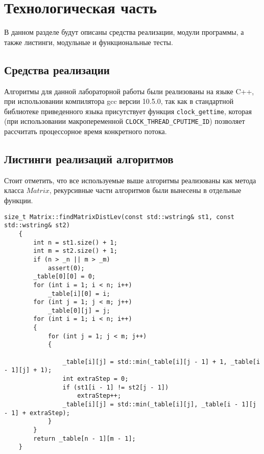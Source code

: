 \chapter{Технологическая часть}
В данном разделе будут описаны средства реализации, модули программы, а также листинги, модульные и функциональные тесты.

\section{Средства реализации}
Алгоритмы для данной лабораторной работы были реализованы на языке C++, при использовании компилятора gcc версии 10.5.0, так как в стандартной библиотеке приведенного языка
присутствует функция \texttt{clock\_gettime}, которая (при использовании макропеременной \texttt{CLOCK\_THREAD\_CPUTIME\_ID}) позволяет рассчитать процессорное время конкретного потока.\cite{cpp-time}



\section{Листинги реализаций алгоритмов}

Стоит отметить, что все используемые выше алгоритмы реализованы как метода класса $Matrix$, рекурсивные части алгоритмов были вынесены в отдельные функции.

\begin{lstlisting}[label=lst:lev_matr,caption=Метод нахождения расстояния Левенштейна с использованием матрицы]
    size_t Matrix::findMatrixDistLev(const std::wstring& st1, const std::wstring& st2)
    {
        int n = st1.size() + 1;
        int m = st2.size() + 1;
        if (n > _n || m > _m)
            assert(0);
        _table[0][0] = 0;
        for (int i = 1; i < n; i++)
            _table[i][0] = i;
        for (int j = 1; j < m; j++)
            _table[0][j] = j;
        for (int i = 1; i < n; i++)
        {
            for (int j = 1; j < m; j++)
            {
    
                _table[i][j] = std::min(_table[i][j - 1] + 1, _table[i - 1][j] + 1);
                int extraStep = 0;
                if (st1[i - 1] != st2[j - 1])
                    extraStep++;
                _table[i][j] = std::min(_table[i][j], _table[i - 1][j - 1] + extraStep);
            }
        }
        return _table[n - 1][m - 1];
    }
\end{lstlisting}

